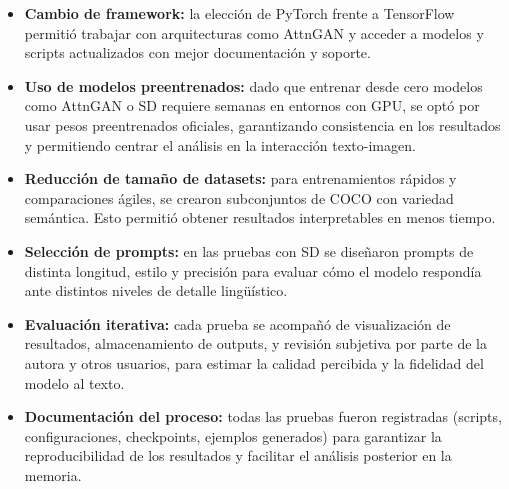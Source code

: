 \begin{itemize}
\item \textbf{Cambio de framework:} la elección de PyTorch frente a TensorFlow permitió trabajar con arquitecturas como AttnGAN y acceder a modelos y scripts actualizados con mejor documentación y soporte.

\item \textbf{Uso de modelos preentrenados:} dado que entrenar desde cero modelos como AttnGAN o SD requiere semanas en entornos con GPU, se optó por usar pesos preentrenados oficiales, garantizando consistencia en los resultados y permitiendo centrar el análisis en la interacción texto-imagen.

\item \textbf{Reducción de tamaño de datasets:} para entrenamientos rápidos y comparaciones ágiles, se crearon subconjuntos de COCO con variedad semántica. Esto permitió obtener resultados interpretables en menos tiempo.

\item \textbf{Selección de prompts:} en las pruebas con SD se diseñaron prompts de distinta longitud, estilo y precisión para evaluar cómo el modelo respondía ante distintos niveles de detalle lingüístico.

\item \textbf{Evaluación iterativa:} cada prueba se acompañó de visualización de resultados, almacenamiento de outputs, y revisión subjetiva por parte de la autora y otros usuarios, para estimar la calidad percibida y la fidelidad del modelo al texto.

\item \textbf{Documentación del proceso:} todas las pruebas fueron registradas (scripts, configuraciones, checkpoints, ejemplos generados) para garantizar la reproducibilidad de los resultados y facilitar el análisis posterior en la memoria.

\end{itemize}
